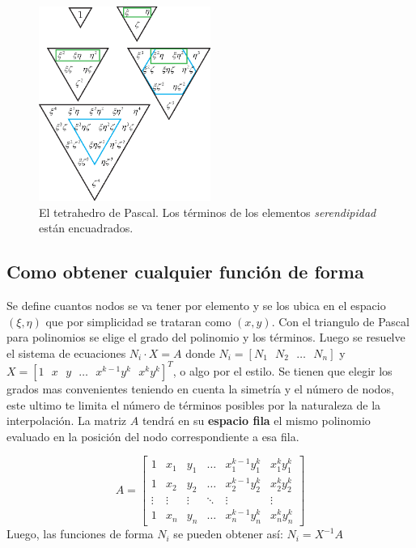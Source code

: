 \documentclass[11pt, a4paper,titlepage]{article}
\newcommand{\ms}{\ \ \ } %
\begin{document}
\begin{figure}
    \centering
    \includegraphics[width=0.5\textwidth]{fig/pascalsTetra.eps}
    \caption{El tetrahedro de Pascal. Los términos de los elementos \textit{serendipidad} están encuadrados.}
    \label{fig:PascalsTetrahedron}
\end{figure}

\subsection{Como obtener cualquier función de forma}
Se define cuantos nodos se va tener por elemento y se los ubica en el espacio $(\xi,\eta)$ que por simplicidad se trataran como $(x,y)$. Con el triangulo de Pascal para polinomios se elige el grado del polinomio y los términos. Luego se resuelve el sistema de ecuaciones $N_i\cdot X= A$ donde $N_i=[N_1\ms N_2 \ms \ldots\ms N_n]$ y $X=[1\ms x\ms y \ms\ldots\ms x^{k-1}y^{k} \ms x^{k}y^{k}]^T$, o algo por el estilo. Se tienen que elegir los grados mas convenientes teniendo en cuenta la simetría y el número de nodos, este ultimo te limita el número de términos posibles por la naturaleza de la interpolación. La matriz $A$ tendrá en su \textbf{espacio fila} el mismo polinomio evaluado en la posición del nodo correspondiente a esa fila.

\[
A=
\begin{bmatrix}
    1 & x_1 & y_1 & \dots  & x_{1}^{k-1}y_1^{k} & x_{1}^{k}y_1^{k} \\
    1 & x_2 & y_2 & \dots  & x_{2}^{k-1}y_2^{k} & x_{2}^{k}y_2^{k} \\
    \vdots & \vdots & \vdots & \ddots & \vdots& \vdots \\
    1 & x_n & y_n & \dots  & x_{n}^{k-1}y_n^{k} & x_{n}^{k}y_n^{k}
\end{bmatrix}
\]
Luego, las funciones de forma $N_i$ se pueden obtener así: $N_i=X^{-1} A$
\end{document}
